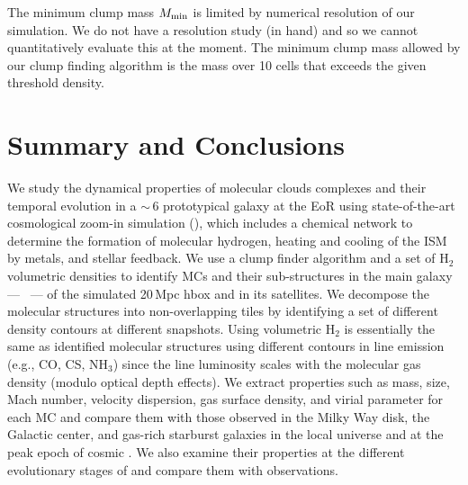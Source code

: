 \IfFileExists{emulateapjlegacy.cls}{\documentclass[iop]{emulateapjlegacy}}{\documentclass[iop]{emulateapj}}
\begin{document}
The minimum clump mass $M_{\rm min}$ is limited by numerical resolution of our simulation. We do not have a resolution study (in hand) and so we cannot quantitatively evaluate this at the moment. The minimum clump mass allowed
by our clump finding algorithm is the mass over 10 cells that exceeds the given threshold density.



\section{Summary and Conclusions}      \label{sec:conclusion}

We study the dynamical properties of molecular clouds complexes and their temporal evolution in a \z$\sim$\,6 prototypical galaxy 
at the EoR using state-of-the-art cosmological zoom-in simulation (),
which includes a chemical network to determine the formation of molecular
hydrogen, heating and cooling of the ISM by metals, and stellar feedback.
We use a clump finder algorithm and a set of H$_2$ volumetric densities
to identify MCs and their sub-structures in the main galaxy --- \flower\ --- of the
simulated 20\,Mpc h\pmOne box and in its satellites.
We decompose the molecular structures into non-overlapping tiles
by identifying a set of different density contours at different snapshots.
Using volumetric H$_2$ is essentially the same as identified molecular structures using
different contours in line emission (e.g., CO, CS, NH$_3$)
since the line luminosity scales with the molecular gas density (modulo optical depth effects).
We extract properties such as mass, size, Mach number, velocity dispersion, gas surface density, and virial parameter for each MC and 
compare them with those observed in the Milky Way disk, the Galactic center,
and gas-rich starburst galaxies in the local universe and at the peak epoch of cosmic \SF.
We also examine their properties at the different evolutionary stages of \flower and compare
them with observations. 
\end{document}
